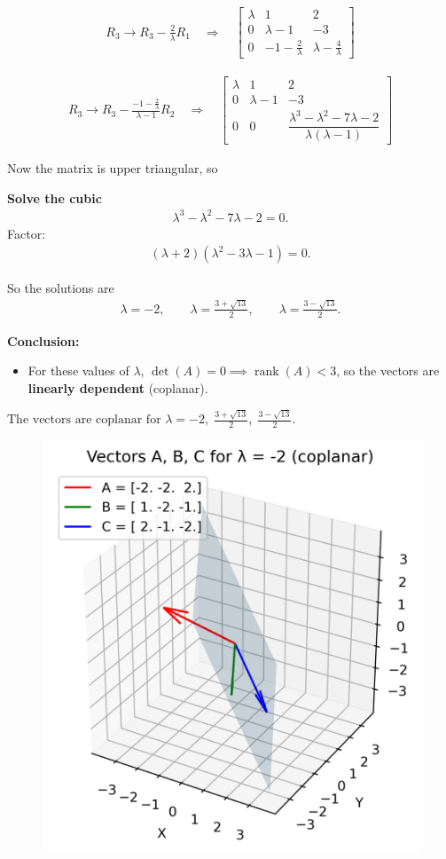 \documentclass[journal]{IEEEtran}
\begin{document}
\begin{align}
R_3 \to R_3 - \tfrac{2}{\lambda}R_1 \quad \Rightarrow \quad
\begin{bmatrix}
\lambda & 1 & 2 \\
0 & \lambda-1 & -3 \\
0 & -1-\tfrac{2}{\lambda} & \lambda - \tfrac{4}{\lambda}
\end{bmatrix}
\end{align}

\begin{align}
R_3 \to R_3 - \frac{-1-\tfrac{2}{\lambda}}{\lambda-1}R_2
\quad \Rightarrow \quad
\begin{bmatrix}
\lambda & 1 & 2 \\
0 & \lambda-1 & -3 \\
0 & 0 & \dfrac{\lambda^3-\lambda^2-7\lambda-2}{\lambda(\lambda-1)}
\end{bmatrix}
\end{align}

Now the matrix is upper triangular, so


\bigskip

\textbf{Solve the cubic}  
\begin{align}
\lambda^3 - \lambda^2 - 7\lambda - 2 = 0.
\end{align}
Factor:
\begin{align}
(\lambda+2)(\lambda^2 - 3\lambda - 1) = 0.
\end{align}

So the solutions are
\begin{align}
\lambda = -2, \qquad \lambda = \frac{3+\sqrt{13}}{2}, \qquad \lambda = \frac{3-\sqrt{13}}{2}.
\end{align}

\bigskip
\textbf{Conclusion:}  
\begin{itemize}
\item For these values of $\lambda$, $\det(A)=0 \implies \operatorname{rank}(A)<3$, so the vectors are \textbf{linearly dependent} (coplanar).
\end{itemize}

$\boxed{\text{The vectors are coplanar for } \lambda=-2, \; \tfrac{3+\sqrt{13}}{2}, \; \tfrac{3-\sqrt{13}}{2}.}$
\begin{figure}[H]
    \centering
    \includegraphics[width=0.86\columnwidth]{figs/01.png}
    \label{fig-1}
\end{figure}
\end{document}
